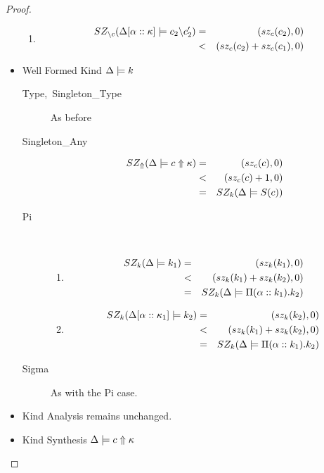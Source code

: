 \documentclass[12pt,twoside,fleqn]{amsart}
\theoremstyle{plain}
\theoremstyle{plain}
\theoremstyle{definition}
\begin{document}
\begin{proof}
\begin{itemize}
\begin{enumerate}
\item 
\begin{eqnarray*}
SZ_{\backslash c}(\Delta  [\alpha   ::\kappa   ]  \models c_{2}  \backslash c_{2}'  ) & = & (sz_{c}(c_{2} ),0)\\
 & < & (sz_{c}(c_{2} )+sz_{c}(c_{1} ),0)
\end{eqnarray*}

\end{enumerate}
\item Well Formed Kind \( \Delta  \models k \)

\begin{description}
\item [Type,~Singleton\_Type]As before
\item [Singleton\_Any]
\begin{eqnarray*}
SZ_{\Uparrow }(\Delta   \models c  \Uparrow \kappa   ) & = & (sz_{c}(c ),0)\\
 & < & (sz_{c}(c )+1,0)\\
 & = & SZ_k(\Delta   \models S(c) )
\end{eqnarray*}

\item [Pi]~

\begin{enumerate}
\item 
\begin{eqnarray*}
SZ_k(\Delta   \models k_{1} ) & = & (sz_k(k_{1}),0)\\
 & < & (sz_k(k_{1})+sz_k(k_{2}),0)\\
 & = & SZ_k(\Delta   \models \Pi (\alpha ::k_{1}).k_{2} )
\end{eqnarray*}

\item 
\begin{eqnarray*}
SZ_k(\Delta  [\alpha   ::\kappa _{1}  ]  \models k_{2} ) & = & (sz_k(k_{2}),0)\\
 & < & (sz_k(k_{1})+sz_k(k_{2}),0)\\
 & = & SZ_k(\Delta   \models \Pi (\alpha ::k_{1}).k_{2} )
\end{eqnarray*}

\end{enumerate}
\item [Sigma]As with the Pi case.
\end{description}
\item Kind Analysis remains unchanged.
\item Kind Synthesis \( \Delta  \models c \Uparrow \kappa  \)


\end{itemize}
\end{proof}
\end{document}

